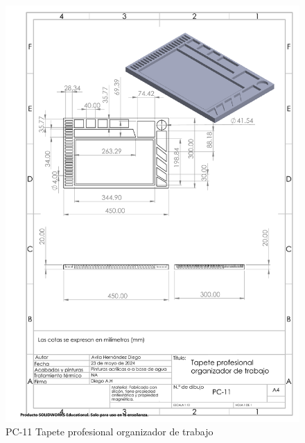     \begin{figure}[H]
        \centering
        \includegraphics[scale=0.4]{3/Img/tapeteProfesionalOrganizadorDeTrabajoDibujo.pdf}
        \caption{PC-11 Tapete profesional organizador de trabajo} 
        \label{fig:tapeteProfesionalOrganizadorDeTrabajoDibujo}
    \end{figure}
